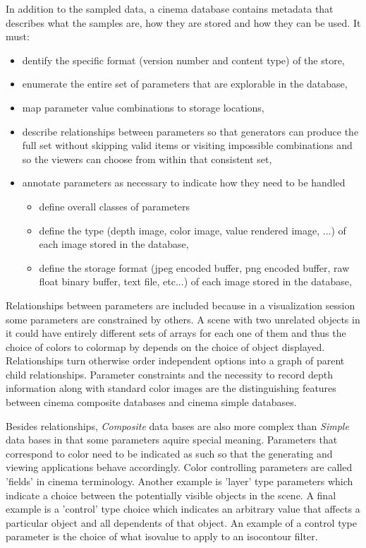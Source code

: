 \documentclass{article}
\newcommand{\Composite} {\textit{Composite}\xspace}
\newcommand{\Simple} {\textit{Simple}\xspace}
\begin{document}
In addition to the sampled data, a cinema database contains metadata that describes what the samples are, how they are stored and how they can be used. It must:
\begin{itemize}
\item dentify the specific format (version number and content type) of the store,
\item enumerate the entire set of parameters that are explorable in the database,
\item map parameter value combinations to storage locations,
\item describe relationships between parameters so that generators can produce the full set without skipping valid items or visiting impossible combinations and so the viewers can choose from within that consistent set,
\item annotate parameters as necessary to indicate how they need to be handled
  \begin{itemize}
    \item define overall classes of parameters
    \item define the type (depth image, color image, value rendered image, ...) of each image stored in the database,
    \item define the storage format (jpeg encoded buffer, png encoded buffer, raw float binary buffer, text file, etc...) of each image stored in the database,
  \end{itemize}
\end{itemize}

Relationships between parameters are included because in a visualization session some parameters are constrained by others. A scene with two unrelated objects in it could have entirely different sets of arrays for each one of them and thus the choice of colors to colormap by depends on the choice of object displayed. Relationships turn otherwise order independent options into a graph of parent child relationships. Parameter constraints and the necessity to record depth information along with standard color images are the distinguishing features between cinema composite databases and cinema simple databases.

Besides relationships, \Composite data bases are also more complex than \Simple data bases in that some parameters aquire special meaning. Parameters that correspond to color need to be indicated as such so that the generating and viewing applications behave accordingly. Color controlling parameters are called 'fields' in cinema terminology. Another example is 'layer' type parameters which indicate a choice between the potentially visible objects in the scene. A final example is a 'control' type choice which indicates an arbitrary value that affects a particular object and all dependents of that object. An example of a control type parameter is the choice of what isovalue to apply to an isocontour filter.
\end{document}

